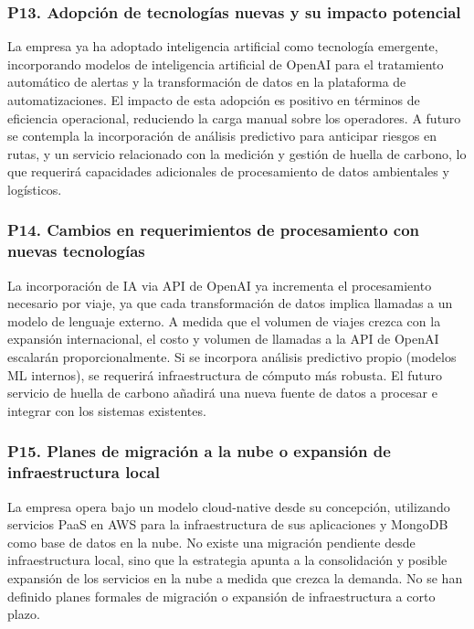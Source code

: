 \documentclass[12pt]{article}
\begin{document}
\subsubsection*{\textbf{P13. Adopci\'on de tecnolog\'ias nuevas y su impacto potencial}}

La empresa ya ha adoptado inteligencia artificial como tecnolog\'ia emergente, incorporando
modelos de inteligencia artificial de OpenAI para el tratamiento autom\'atico de alertas y la transformaci\'on
de datos en la plataforma de automatizaciones. El impacto de esta adopci\'on es positivo en
t\'erminos de eficiencia operacional, reduciendo la carga manual sobre los operadores. A futuro
se contempla la incorporaci\'on de an\'alisis predictivo para anticipar riesgos en rutas, y un
servicio relacionado con la medici\'on y gesti\'on de huella de carbono, lo que requerir\'a
capacidades adicionales de procesamiento de datos ambientales y log\'isticos.

\subsubsection*{\textbf{P14. Cambios en requerimientos de procesamiento con nuevas tecnolog\'ias}}

La incorporaci\'on de IA via API de OpenAI ya incrementa el procesamiento necesario por viaje,
ya que cada transformaci\'on de datos implica llamadas a un modelo de lenguaje externo. A medida
que el volumen de viajes crezca con la expansi\'on internacional, el costo y volumen de llamadas
a la API de OpenAI escalar\'an proporcionalmente. Si se incorpora an\'alisis predictivo propio
(modelos ML internos), se requerir\'a infraestructura de c\'omputo m\'as robusta. El futuro
servicio de huella de carbono a\~nadir\'a una nueva fuente de datos a procesar e integrar con
los sistemas existentes.

\subsubsection*{\textbf{P15. Planes de migraci\'on a la nube o expansi\'on de infraestructura local}}

La empresa opera bajo un modelo cloud-native desde su concepci\'on, utilizando servicios PaaS
en AWS para la infraestructura de sus aplicaciones y MongoDB como base de datos en la nube.
No existe una migraci\'on pendiente desde infraestructura local, sino que la estrategia apunta
a la consolidaci\'on y posible expansi\'on de los servicios en la nube a medida que crezca la
demanda. No se han definido planes formales de migraci\'on o expansi\'on de infraestructura a
corto plazo.
\end{document}
